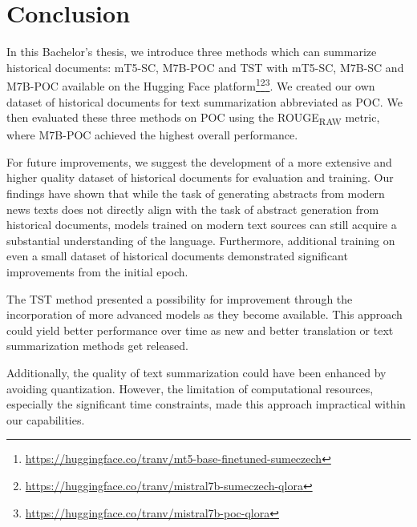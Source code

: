\documentclass[english, ba, kiv, he, iso690numb, pdf, viewonly]{fasthesis}
\begin{document}
\chapter{Conclusion}
In this Bachelor's thesis, we introduce three methods which can summarize historical documents: mT5-SC, M7B-POC and TST with mT5-SC, M7B-SC and M7B-POC available on the Hugging Face platform\footnote{\url{https://huggingface.co/tranv/mt5-base-finetuned-sumeczech}}\footnote{\url{https://huggingface.co/tranv/mistral7b-sumeczech-qlora}}\footnote{\url{https://huggingface.co/tranv/mistral7b-poc-qlora}}. We created our own dataset of historical documents for text summarization abbreviated as POC. We then evaluated these three methods on POC using the ROUGE\textsubscript{RAW} metric, where M7B-POC achieved the highest overall performance. 

For future improvements, we suggest the development of a more extensive and higher quality dataset of historical documents for evaluation and training. Our findings have shown that while the task of generating abstracts from modern news texts does not directly align with the task of abstract generation from historical documents, models trained on modern text sources can still acquire a substantial understanding of the language. Furthermore, additional training on even a small dataset of historical documents demonstrated significant improvements from the initial epoch.

The TST method presented a possibility for improvement through the incorporation of more advanced models as they become available. This approach could yield better performance over time as new and better translation or text summarization methods get released.

Additionally, the quality of text summarization could have been enhanced by avoiding quantization. However, the limitation of computational resources, especially the significant time constraints, made this approach impractical within our capabilities.

%
%
%
%
\end{document}
